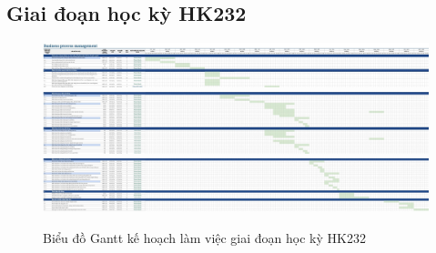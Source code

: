 \subsection{Giai đoạn học kỳ HK232}

\begin{figure} [H]
    \centering
    \includegraphics[width = \linewidth]{Content/Giới thiệu đề tài/images/PCCV_HK232_1.jpg}
    \includegraphics[width = \linewidth]{Content/Giới thiệu đề tài/images/PCCV_HK232_2.jpg}
    \includegraphics[width = \linewidth]{Content/Giới thiệu đề tài/images/PCCV_HK232_3.jpg}
    \vspace{0.5cm}
    \caption{Biểu đồ Gantt kế hoạch làm việc giai đoạn học kỳ HK232}
    \label{fig:Biểu đồ Gantt kế hoạch làm việc giai đoạn học kỳ HK232}
\end{figure}

